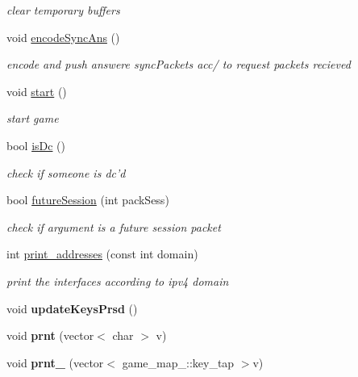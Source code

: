 \begin{DoxyCompactItemize}
\begin{DoxyCompactList}\small\item\em clear temporary buffers \end{DoxyCompactList}\item 
\hypertarget{class_network_ad583a71e64ab886a8cbf21d2e6e34eea}{void \hyperlink{class_network_ad583a71e64ab886a8cbf21d2e6e34eea}{encode\+Sync\+Ans} ()}\label{class_network_ad583a71e64ab886a8cbf21d2e6e34eea}

\begin{DoxyCompactList}\small\item\em encode and push answere sync\+Packets acc/ to request packets recieved \end{DoxyCompactList}\item 
\hypertarget{class_network_aa512c1abc3918e9e419d0430d5a9850c}{void \hyperlink{class_network_aa512c1abc3918e9e419d0430d5a9850c}{start} ()}\label{class_network_aa512c1abc3918e9e419d0430d5a9850c}

\begin{DoxyCompactList}\small\item\em start game \end{DoxyCompactList}\item 
\hypertarget{class_network_a445cc0a591b33ef222ff8e2d4fff55ba}{bool \hyperlink{class_network_a445cc0a591b33ef222ff8e2d4fff55ba}{is\+Dc} ()}\label{class_network_a445cc0a591b33ef222ff8e2d4fff55ba}

\begin{DoxyCompactList}\small\item\em check if someone is dc'd \end{DoxyCompactList}\item 
bool \hyperlink{class_network_a7c1e93325fe69b8fb448e1b1a7a49086}{future\+Session} (int pack\+Sess)
\begin{DoxyCompactList}\small\item\em check if argument is a future session packet \end{DoxyCompactList}\item 
int \hyperlink{class_network_aa133d29111910963a963b38ab2105553}{print\+\_\+addresses} (const int domain)
\begin{DoxyCompactList}\small\item\em print the interfaces according to ipv4 domain \end{DoxyCompactList}\item 
\hypertarget{class_network_a8225652c75f6c7c0442dbecee820b1aa}{void {\bfseries update\+Keys\+Prsd} ()}\label{class_network_a8225652c75f6c7c0442dbecee820b1aa}

\item 
\hypertarget{class_network_a150c0252d7f71def8cc2740c39bf508b}{void {\bfseries prnt} (vector$<$ char $>$ v)}\label{class_network_a150c0252d7f71def8cc2740c39bf508b}

\item 
\hypertarget{class_network_a7ff12530f12177be493079fbe168b86b}{void {\bfseries prnt\+\_\+} (vector$<$ game\+\_\+map\+\_\+\+::key\+\_\+tap $>$v)}\label{class_network_a7ff12530f12177be493079fbe168b86b}

\end{DoxyCompactItemize}
